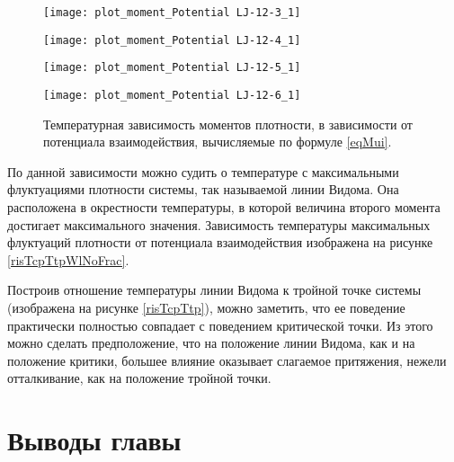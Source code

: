 \begin{figure}[h]
\begin{center}
\begin{minipage}[h]{0.45\linewidth}
\texttt{[image: plot\_moment\_Potential LJ-12-3\_1]}
\end{minipage}
\begin{minipage}[h]{0.45\linewidth}
\texttt{[image: plot\_moment\_Potential LJ-12-4\_1]}
\end{minipage}


\begin{minipage}[h]{0.45\linewidth}
\texttt{[image: plot\_moment\_Potential LJ-12-5\_1]}
\end{minipage}
\begin{minipage}[h]{0.45\linewidth}
\texttt{[image: plot\_moment\_Potential LJ-12-6\_1]}
\end{minipage}
\caption{Температурная зависимость моментов плотности, в зависимости от потенциала взаимодействия, вычисляемые по формуле \ref{eqMui}.}
\label{risMu}
\end{center}
\end{figure}

По данной зависимости можно судить о температуре с максимальными флуктуациями плотности системы, так называемой линии Видома. Она расположена в окрестности температуры, в которой величина второго момента достигает максимального значения. Зависимость температуры максимальных флуктуаций плотности от потенциала взаимодействия изображена на рисунке \ref{risTcpTtpWlNoFrac}. 

Построив отношение температуры линии Видома к тройной точке системы (изображена на рисунке \ref{risTcpTtp}), можно заметить, что ее поведение практически полностью совпадает с поведением критической точки. Из этого можно сделать предположение, что на положение линии Видома, как и на положение критики, большее влияние оказывает слагаемое притяжения, нежели отталкивание, как на положение тройной точки. 


\section{Выводы главы}\label{C2_4}


